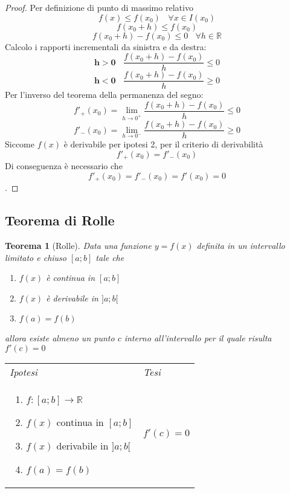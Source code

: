 \documentclass{article}     %
\newcommand\R{\mathbb{R}}
\newtheorem*{theorem}{Teorema}
\newenvironment{shadedTheorem}%
  {\begin{mdframed}[backgroundcolor=lightgray!40, linecolor=white, innertopmargin=4pt, innerbottommargin=13pt]\begin{theorem}}%
  {\end{theorem}\end{mdframed}}
\begin{document}
        \begin{proof}
        Per definizione di punto di massimo relativo
        \[f(x) \leq f(x_0) ~~~~\forall x \in I(x_0)\]
        \[f(x_0+h)\leq f(x_0)\]
        \[f(x_0+h)-f(x_0)\leq 0~~~~ \forall h \in \R\]
        Calcolo i rapporti incrementali da sinistra e da destra:
        \[\mathbf{h>0}~~~~ \frac{f(x_0+h)-f(x_0)}{h}\leq 0\]
        \[\mathbf{h<0}~~~~ \frac{f(x_0+h)-f(x_0)}{h}\geq 0\]
        Per l'inverso del teorema della permanenza del segno:
        \[f'_+(x_0)=\lim_{h\to 0^+}\frac{f(x_0+h)-f(x_0)}{h}\leq 0\]
        \[f'_-(x_0)=\lim_{h\to 0^-}\frac{f(x_0+h)-f(x_0)}{h}\geq 0\]
        Siccome $f(x)$ è derivabile per ipotesi 2, per il criterio di derivabilità
        \[f'_+(x_0)=f'_-(x_0)\]
        Di conseguenza è necessario che \[f'_+(x_0)=f'_-(x_0)=f'(x_0)=0\].
        \end{proof}
        
    \subsection{Teorema di Rolle}
        \begin{shadedTheorem}[Rolle]
        Data una funzione $y=f(x)$ definita in un intervallo limitato e chiuso $[a;b]$ tale che \begin{enumerate}
            \item $f(x)$ è continua in $[a;b]$
            \item $f(x)$ è derivabile in $]a;b[$
            \item $f(a)=f(b)$
        \end{enumerate}
        allora esiste almeno un punto $c$ interno all'intervallo per il quale risulta $f'(c)=0$
        \end{shadedTheorem}
        \begin{tabular}{m{}m{}}
            \textit{Ipotesi} & \textit{Tesi}  \\
            \begin{enumerate}
            \item $f:[a;b] \to \R$
            \item $f(x)$ continua in $[a;b]$
            \item $f(x)$ derivabile in $]a;b[$
            \item $f(a)=f(b)$
        \end{enumerate} & $f'(c)=0$
        \end{tabular}
        
\end{document}
